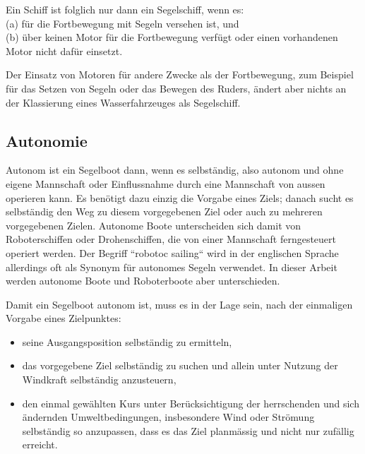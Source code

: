 Ein Schiff ist folglich nur dann ein Segelschiff, wenn es:\\
(a) für die Fortbewegung mit Segeln versehen ist, und\\
(b) über keinen Motor für die Fortbewegung verfügt oder einen vorhandenen Motor nicht dafür einsetzt. 

Der Einsatz von Motoren für andere Zwecke als der Fortbewegung, zum Beispiel für das Setzen von Segeln oder das Bewegen des Ruders, ändert aber nichts an der Klassierung eines Wasserfahrzeuges als Segelschiff. 

\subsection{Autonomie}
Autonom ist ein Segelboot dann, wenn es selbständig, also autonom und ohne eigene Mannschaft oder Einflussnahme durch eine Mannschaft von aussen operieren kann. Es benötigt dazu einzig die Vorgabe eines Ziels; danach sucht es selbständig den Weg zu diesem vorgegebenen Ziel oder auch zu mehreren vorgegebenen Zielen. Autonome Boote unterscheiden sich damit von Roboterschiffen oder Drohenschiffen, die von einer Mannschaft ferngesteuert operiert werden. Der Begriff ``robotoc sailing`` wird in der englischen Sprache allerdings oft als Synonym für autonomes Segeln verwendet. In dieser Arbeit werden autonome Boote und  Roboterboote aber unterschieden. 

Damit ein Segelboot autonom ist, muss es in der Lage sein, nach der einmaligen Vorgabe eines Zielpunktes: 
\begin{itemize}
    \item seine Ausgangsposition selbständig zu ermitteln,
    \item das vorgegebene Ziel selbständig zu suchen und allein unter Nutzung der Windkraft selbständig anzusteuern,
    \item den einmal gewählten Kurs unter Berücksichtigung der herrschenden und sich ändernden Umweltbedingungen, insbesondere Wind oder Strömung selbständig so anzupassen, dass es das Ziel planmässig und nicht nur zufällig erreicht.
\end{itemize}
